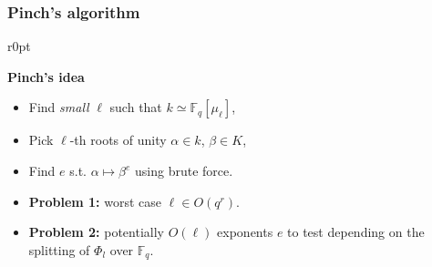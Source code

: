\documentclass[francais]{beamer}
\def\F {\ensuremath{\mathbb{F}}}
\newcommand{\paragraph}[1]{\smallskip\textbf{#1}}
\begin{document}
\begin{frame}\frametitle{Pinch's algorithm}
      \begin{wrapfigure}[3]{r}{0pt}
    \end{wrapfigure}

    \paragraph{Pinch's idea}
    \begin{itemize}
    \item Find \emph{small} $\ell$ such that $k\simeq\F_q[\mu_\ell]$,
    \item Pick $\ell$-th roots of unity $\alpha\in k$, $\beta\in K$,
    \item Find $e$ s.t. $\alpha\mapsto\beta^e$ using brute force.
    \item \textbf{Problem 1:} worst case $\ell\in O(q^r)$.
    \item \textbf{Problem 2:} potentially $O(\ell)$ exponents $e$ to test
      depending on the splitting of $\Phi_l$ over $\F_q$.
    \end{itemize}
\end{frame}
\end{document}
